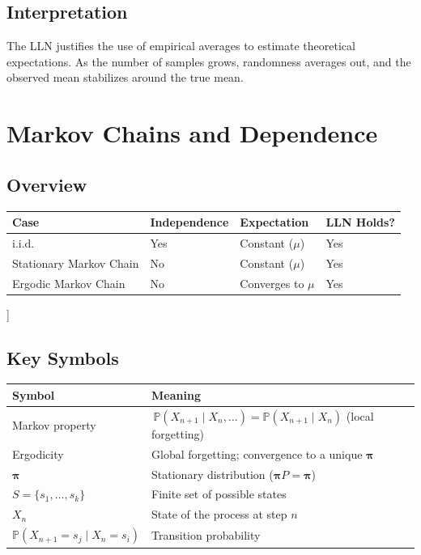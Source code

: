 \subsection*{Interpretation}

The LLN justifies the use of empirical averages to estimate theoretical expectations. As the number of samples grows, randomness averages out, and the observed mean stabilizes around the true mean.



\section{Markov Chains and Dependence}

\subsection*{Overview}

\begin{center}
\begin{tabular}{llll}
\toprule
\textbf{Case} & \textbf{Independence} & \textbf{Expectation} & \textbf{LLN Holds?} \\
\midrule
i.i.d. & Yes & Constant ($\mu$) & Yes \\
Stationary Markov Chain & No & Constant ($\mu$) & Yes \\
Ergodic Markov Chain & No & Converges to $\mu$ & Yes \\
\bottomrule
\end{tabular}
\end{center}]

\subsection*{Key Symbols}

\begin{center}
\begin{tabular}{ll}
\toprule
\textbf{Symbol} & \textbf{Meaning} \\
\midrule
Markov property & $\,\mathbb{P}(X_{n+1}\!\mid X_n,\dots)=\mathbb{P}(X_{n+1}\!\mid X_n)$ (local forgetting) \\
Ergodicity & Global forgetting; convergence to a unique $\boldsymbol{\pi}$ \\
$\boldsymbol{\pi}$ & Stationary distribution ($\boldsymbol{\pi}P=\boldsymbol{\pi}$) \\
$S = \{s_1, \dots, s_k\}$ & Finite set of possible states \\
$X_n$ & State of the process at step $n$ \\
$\mathbb{P}(X_{n+1}=s_j \mid X_n=s_i)$ & Transition probability \\
\bottomrule
\end{tabular}
\end{center}


